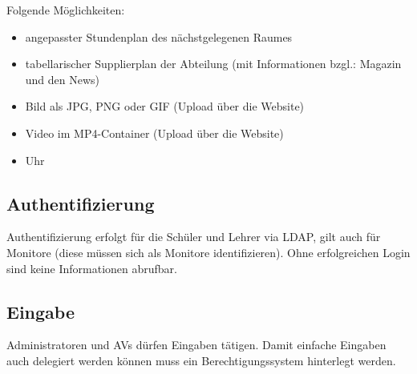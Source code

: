 Folgende Möglichkeiten:
\begin{itemize}
	\item 
		angepasster Stundenplan des nächstgelegenen Raumes
	\item
		tabellarischer Supplierplan der Abteilung (mit Informationen bzgl.: Magazin und den News)
	\item
		Bild als JPG, PNG oder GIF (Upload über die Website)
	\item
		Video im MP4-Container (Upload über die Website)
	\item
		Uhr
\end{itemize}

\subsection{Authentifizierung}
Authentifizierung erfolgt für die Schüler und Lehrer via LDAP, gilt auch für Monitore (diese müssen sich als Monitore identifizieren). Ohne erfolgreichen Login sind keine Informationen abrufbar.

\subsection{Eingabe}
Administratoren und AVs dürfen Eingaben tätigen. Damit einfache Eingaben auch delegiert werden können muss ein Berechtigungssystem hinterlegt werden.

